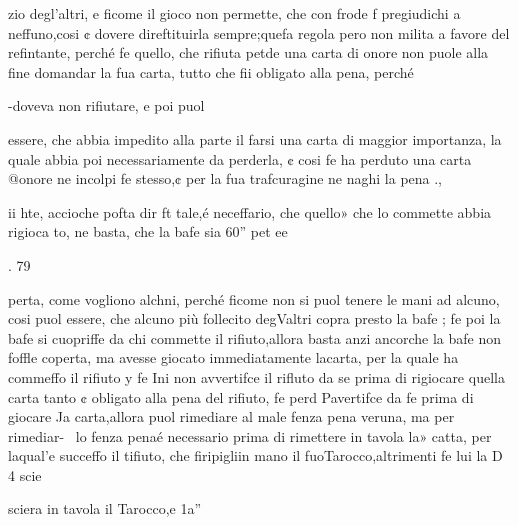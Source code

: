 \documentclass[12pt,a6paper]{article}
\begin{document}
 

 

 

 

 

 

 

zio degl’altri, e ficome il gioco
non permette, che con frode f
pregiudichi a neffuno,cosi ¢ dovere direftituirla sempre;quefa
regola pero non milita a favore
del refintante, perché fe quello,
che rifiuta petde una carta di
onore non puole alla fine domandar la fua carta, tutto che
fii obligato alla pena, perché

-doveva non rifiutare, e poi puol

essere, che abbia impedito alla
parte il farsi una carta di maggior importanza, la quale abbia poi necessariamente da perderla, ¢ cosi fe ha perduto una
carta @onore ne incolpi fe stesso,¢ per la fua trafcuragine ne
naghi la pena .,

ii hte, accioche pofta dir ft
tale,é neceffario, che quello»
che lo commette abbia rigioca
to, ne basta, che la bafe sia 60”
pet
ee
   
 
  
   
   
 
 
  
  
  
   
  
  
  
  

. 79

perta, come vogliono alchni,
perché ficome non si puol tenere le mani ad alcuno, cosi puol
essere, che alcuno più follecito
degValtri copra presto la bafe ;
fe poi la bafe si cuopriffe da chi
commette il rifiuto,allora basta
anzi ancorche la bafe non foffle
coperta, ma avesse giocato immediatamente lacarta, per la
quale ha commeffo il rifiuto y
fe Ini non avvertifce il rifluto da
se prima di rigiocare quella carta tanto ¢ obligato alla pena del
rifiuto, fe perd Pavertifce da fe
prima di giocare Ja carta,allora
puol rimediare al male fenza
pena veruna, ma per rimediar-~
lo fenza penaé necessario prima di rimettere in tavola la»
catta, per laqual’e succeffo il
tifiuto, che firipigliin mano il
fuoTarocco,altrimenti fe lui la
D 4 scie
 
 

 

 

 

 

 

sciera in tavola il Tarocco,e 1a”
\end{document}
